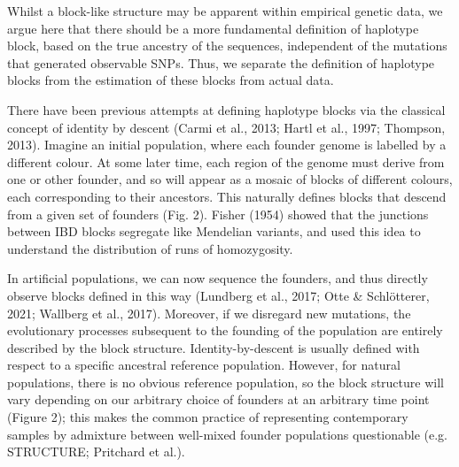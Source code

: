 \documentclass[twocolumn]{bmcart}%
\begin{document}
Whilst a block-like structure may be apparent within empirical genetic data, we argue here that there should be a more fundamental definition of haplotype block, based on the true ancestry of the sequences, independent of the mutations that generated observable SNPs. Thus, we separate the definition of haplotype blocks from the estimation of these blocks from actual data.

There have been previous attempts at defining haplotype blocks via the classical concept of identity by descent (Carmi et al., 2013; Hartl et al., 1997; Thompson, 2013). Imagine an initial population, where each founder genome is labelled by a different colour. At some later time, each region of the genome must derive from one or other founder, and so will appear as a mosaic of blocks of different colours, each corresponding to their ancestors. This naturally defines blocks that descend from a given set of founders (Fig. 2). Fisher (1954) showed that the junctions between IBD blocks segregate like Mendelian variants, and used this idea to understand the distribution of runs of homozygosity.

In artificial populations, we can now sequence the founders, and thus directly observe blocks defined in this way (Lundberg et al., 2017; Otte \& Schlötterer, 2021; Wallberg et al., 2017). Moreover, if we disregard new mutations, the evolutionary processes subsequent to the founding of the population are entirely described by the block structure. Identity-by-descent is usually defined with respect to a specific ancestral reference population. However, for natural populations, there is no obvious reference population, so the block structure will vary depending on our arbitrary choice of founders at an arbitrary time point (Figure 2); this makes the common practice of representing contemporary samples by admixture between well-mixed founder populations questionable (e.g. STRUCTURE; Pritchard et al.).
\end{document}
